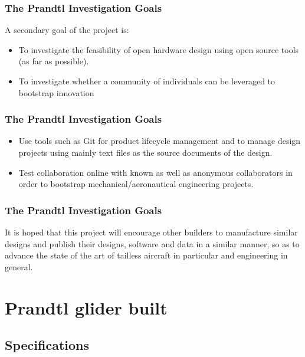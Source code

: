 \documentclass{beamer}
\begin{document}
\begin{frame}
\frametitle{The Prandtl Investigation Goals}

A secondary goal of the project is:

\begin{itemize}
\item To investigate the feasibility of open hardware design using open source tools (as far as possible).  
\item To investigate whether a community of individuals can be leveraged to bootstrap innovation
\end{itemize}

\end{frame}


\begin{frame}
\frametitle{The Prandtl Investigation Goals}

\begin{itemize}
\item Use tools such as Git for product lifecycle management and to manage design projects using mainly text files as the source documents of the design.
\item Test collaboration online with known as well as anonymous collaborators in order to bootstrap mechanical/aeronautical engineering projects.
\end{itemize}

\end{frame}


\begin{frame}
\frametitle{The Prandtl Investigation Goals}

It is hoped that this project will encourage other builders to manufacture similar designs and publish their designs, software and data in a similar manner, so as to advance the state of the art of tailless aircraft in particular and engineering in general.



\end{frame}



\section{Prandtl glider built}


\subsection{Specifications}
\end{document}
